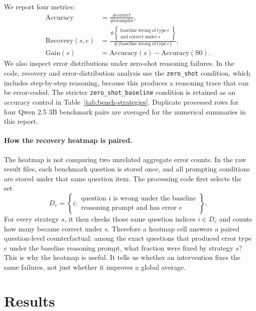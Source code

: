 \documentclass[10pt,twocolumn]{article}
\begin{document}
We report four metrics:
\begin{align}
\mathrm{Accuracy}
&= \frac{\#\mathrm{correct}}{\#\mathrm{examples}},
\\[0.5em]
\mathrm{Recovery}(s,e)
&=
\frac{
\#\left\{
\begin{array}{l}
\mathrm{baseline\ wrong\ of\ type\ } e \\
\mathrm{and\ correct\ under\ } s
\end{array}
\right\}
}{
\#\{\mathrm{baseline\ wrong\ of\ type\ } e\}
},
\\[0.5em]
\mathrm{Gain}(s)
&= \mathrm{Accuracy}(s)-\mathrm{Accuracy}(\mathrm{S0}).
\end{align}
We also inspect error distributions under zero-shot reasoning failures. In the code, recovery and error-distribution analysis use the \texttt{zero\_shot} condition, which includes step-by-step reasoning, because this produces a reasoning trace that can be error-coded. The stricter \texttt{zero\_shot\_baseline} condition is retained as an accuracy control in Table~\ref{tab:bench-strategies}. Duplicate processed rows for four Qwen 2.5 3B benchmark pairs are averaged for the numerical summaries in this report.

\paragraph{How the recovery heatmap is paired.}
The heatmap is not comparing two unrelated aggregate error counts. In the raw result files, each benchmark question is stored once, and all prompting conditions are stored under that same question item. The processing code first selects the set
\[
D_e =
\left\{
i:
\begin{array}{l}
\text{question } i \text{ is wrong under the baseline} \\
\text{reasoning prompt and has error } e
\end{array}
\right\}.
\]
For every strategy $s$, it then checks those same question indices $i\in D_e$ and counts how many became correct under $s$. Therefore a heatmap cell answers a paired question-level counterfactual: among the exact questions that produced error type $e$ under the baseline reasoning prompt, what fraction were fixed by strategy $s$? This is why the heatmap is useful. It tells us whether an intervention fixes the same failures, not just whether it improves a global average.

\section{Results}
\end{document}
